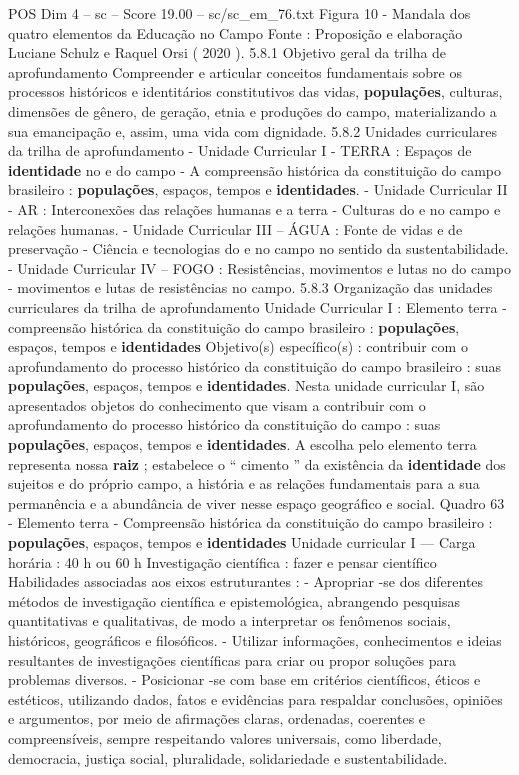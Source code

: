 \begin{textsample}{POS Dim 4 – sc – Score 19.00 – sc/sc\_em\_76.txt}
Figura 10 - Mandala dos quatro elementos da Educação no Campo Fonte : Proposição e elaboração Luciane Schulz e Raquel Orsi ( 2020 ). 5.8.1 Objetivo geral da trilha de aprofundamento Compreender e articular conceitos fundamentais sobre os processos históricos e identitários constitutivos das vidas, \textbf{populações}, culturas, dimensões de gênero, de geração, etnia e produções do campo, materializando a sua emancipação e, assim, uma vida com dignidade. 5.8.2 Unidades curriculares da trilha de aprofundamento - Unidade Curricular I - TERRA : Espaços de \textbf{identidade} no e do campo - A compreensão histórica da constituição do campo brasileiro : \textbf{populações}, espaços, tempos e \textbf{identidades}. - Unidade Curricular II - AR : Interconexões das relações humanas e a terra - Culturas do e no campo e relações humanas. - Unidade Curricular III – ÁGUA : Fonte de vidas e de preservação - Ciência e tecnologias do e no campo no sentido da sustentabilidade. - Unidade Curricular IV – FOGO : Resistências, movimentos e lutas no do campo - movimentos e lutas de resistências no campo. 5.8.3 Organização das unidades curriculares da trilha de aprofundamento Unidade Curricular I : Elemento terra - compreensão histórica da constituição do campo brasileiro : \textbf{populações}, espaços, tempos e \textbf{identidades} Objetivo(s) específico(s) : contribuir com o aprofundamento do processo histórico da constituição do campo brasileiro : suas \textbf{populações}, espaços, tempos e \textbf{identidades}.
Nesta unidade curricular I, são apresentados objetos do conhecimento que visam a contribuir com o aprofundamento do processo histórico da constituição do campo : suas \textbf{populações}, espaços, tempos e \textbf{identidades}.
A escolha pelo elemento terra representa nossa \textbf{raiz} ; estabelece o “ cimento ” da existência da \textbf{identidade} dos sujeitos e do próprio campo, a história e as relações fundamentais para a sua permanência e a abundância de viver nesse espaço geográfico e social.
Quadro 63 - Elemento terra - Compreensão histórica da constituição do campo brasileiro : \textbf{populações}, espaços, tempos e \textbf{identidades} Unidade curricular I — Carga horária : 40 h ou 60 h Investigação científica : fazer e pensar científico Habilidades associadas aos eixos estruturantes : - Apropriar -se dos diferentes métodos de investigação científica e epistemológica, abrangendo pesquisas quantitativas e qualitativas, de modo a interpretar os fenômenos sociais, históricos, geográficos e filosóficos. - Utilizar informações, conhecimentos e ideias resultantes de investigações científicas para criar ou propor soluções para problemas diversos. - Posicionar -se com base em critérios científicos, éticos e estéticos, utilizando dados, fatos e evidências para respaldar conclusões, opiniões e argumentos, por meio de afirmações claras, ordenadas, coerentes e compreensíveis, sempre respeitando valores universais, como liberdade, democracia, justiça social, pluralidade, solidariedade e sustentabilidade.

\end{textsample}
